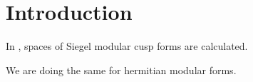 
\section{Introduction}

In \cite{PoorYuen07Comp}, spaces of Siegel modular cusp forms are calculated.

We are doing the same for hermitian modular forms.





